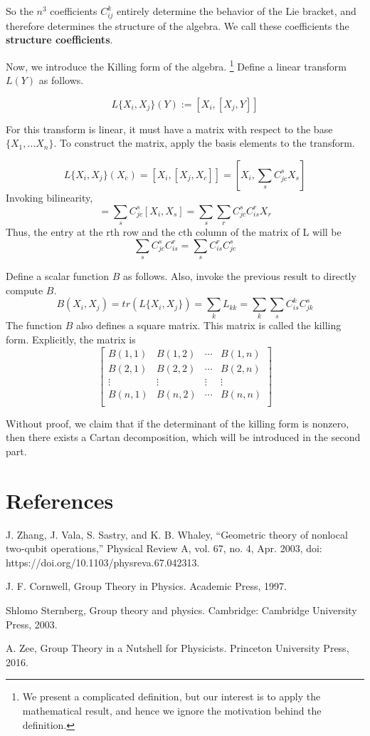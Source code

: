 \documentclass{article}
\begin{document}
So the $n^3$ coefficients $C_{ij}^k$ entirely determine the behavior 
of the Lie bracket, and therefore determines the structure of the algebra. 
We call these coefficients the \textbf{structure coefficients}. 

Now, we introduce the Killing form of the algebra. 
\footnote{We present a complicated definition, 
but our interest is to apply the mathematical result, 
and hence we ignore the motivation behind the definition. }
Define a linear transform $L(Y)$ as follows. 

\[
    L\{X_i, X_j\}(Y) := [X_i, [X_j, Y]]
\]

For this transform is linear, it must have a matrix with respect to 
the base $\{X_1, \dots X_n\}$. To construct the matrix, apply 
the basis elements to the transform. 

\[
    L\{X_i, X_j\}(X_c) =  [X_i, [X_j, X_c]] 
    = \left[X_i, \sum_{s} C_{jc}^s X_s\right]
\]
Invoking bilinearity, 
\[
    = \sum_s C_{jc}^s[X_i, X_s]
    = \sum_s \sum _r C_{jc}^s C_{is}^r X_r
\]
Thus, the entry at the rth row and the cth column of the matrix of L 
will be 
\[
    \sum_s C_{jc}^s C_{is}^r  =  \sum_s C_{is}^r C_{jc}^s
\]

Define a scalar function $B$ as follows. Also, invoke the previous 
result to directly compute $B$. 
\[
    B(X_i, X_j) = tr(L\{X_i, X_j\}) = \sum_k L_{kk} = 
    \sum_k \sum_s C_{is}^k C_{jk}^s
\]
The function $B$ also defines a square matrix. This matrix is called 
the killing form. Explicitly, the matrix is
\[
    \begin{bmatrix}
        B(1, 1) &  B(1, 2) & \cdots & B(1, n)\\
        B(2, 1) &  B(2, 2) & \cdots & B(2, n)\\
        \vdots & \vdots & \vdots & \vdots \\
        B(n, 1) &  B(n, 2) & \cdots & B(n, n)\\
    \end{bmatrix}
\]

Without proof, we claim that if the determinant of the killing 
form is nonzero, then there exists a Cartan decomposition, 
which will be introduced in the second part. 

\newpage

\section{References}
\begin{enumerate}[ {[}1{]} ]
\item J. Zhang, J. Vala, S. Sastry, and K. B. Whaley, “Geometric theory of nonlocal two-qubit operations,” Physical Review A, vol. 67, no. 4, Apr. 2003, doi: https://doi.org/10.1103/physreva.67.042313.

\item J. F. Cornwell, Group Theory in Physics. Academic Press, 1997.

\item Shlomo Sternberg, Group theory and physics. Cambridge: Cambridge University Press, 2003.

\item A. Zee, Group Theory in a Nutshell for Physicists. Princeton University Press, 2016.
‌
\end{enumerate}
\end{document}

